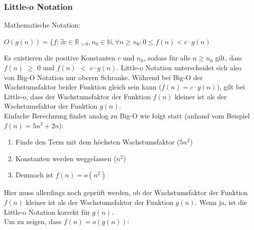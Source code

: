 \documentclass[
../../AuD-Zusammenfassung.tex,
]
{subfiles}
\begin{document}
\subsubsection{Little-o Notation}
Mathematische Notation:
\begin{center}
    $O(g(n)) = \{f: \exists c \in \mathbb{R}_{>0}, n_0 \in \mathbb{N}, \forall n \geq n_0:  0 \leq f(n) < c \cdot g(n)$
\end{center}
Es existieren die positive Konstanten $c$ und $n_0$, sodass für alle $n \geq n_0$ gilt, dass  $f(n)$ $\geq$  0 und $f(n)$ $<$ $c \cdot g(n)$. Little-o Notation unterscheidet sich also von Big-O Notation nur oberen Schranke. Während bei Big-O der Wachstumsfaktor beider Funktion gleich sein kann ($f(n) = c \cdot g(n)$), gilt bei Little-o, dass der Wachstumsfaktor der Funktion $f(n)$ kleiner ist als der Wachstumsfaktor der Funktion $g(n)$. \\
Einfache Berechnung findet analog zu Big-O wie folgt statt (anhand vom Beispiel $f(n) = 5n^2 + 2n$):
\begin{enumerate}
    \item Finde den Term mit dem höchsten Wachstumsfaktor ($5n^2$)
    \item Konstanten werden weggelassen ($n^2$)
    \item Demnach ist $f(n) = o(n^2)$
\end{enumerate}
Hier muss allerdings noch geprüft werden, ob der Wachstumsfaktor der Funktion $f(n)$ kleiner ist als der Wachstumsfaktor der Funktion $g(n)$. Wenn ja, ist die Little-o Notation korrekt für $g(n)$. \\
Um zu zeigen, dass $f(n) = o(g(n))$:
\end{document}
